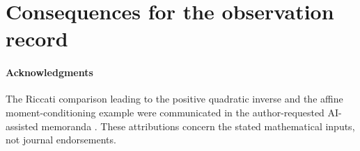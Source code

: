 \part{Consequences for the observation record}




\subsection*{Acknowledgments}
The Riccati comparison leading to the positive quadratic inverse and the
affine moment-conditioning example were communicated in the author-requested
AI-assisted memoranda \cite{A2ReviewV65,A2ReviewV74}.  These attributions
concern the stated mathematical inputs, not journal endorsements.
\appendix
\renewcommand{\theHsection}{principal.appendix.\arabic{section}}



